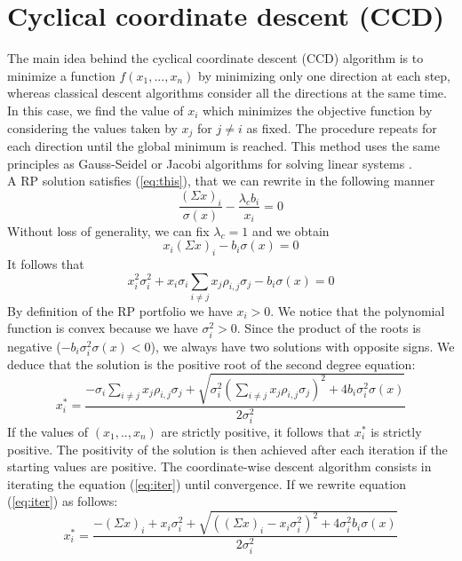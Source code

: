 \section{Cyclical coordinate descent (CCD)}The main idea behind the cyclical coordinate descent (CCD) algorithm is to minimize a function $f(x_1,...,x_n)$ by minimizing only one direction at each step, whereas classical descent algorithms consider all the directions at the same time. In this case, we find the value of $x_i$ which minimizes the objective function by considering the values taken by $x_j$ for $j \neq i$ as fixed. The procedure repeats for each direction until the global minimum is reached. This method uses the same principles as Gauss-Seidel or Jacobi algorithms for solving linear systems  \cite{ccd}.\\
A RP solution satisfies (\ref{eq:this}), that we can rewrite in the following manner
\begin{equation}
\frac{(\Sigma x)_i}{\sigma(x)} - \frac{\lambda_c b_i}{x_i} = 0
\end{equation}
Without loss of generality, we can fix $\lambda_c = 1$ and we obtain
\begin{equation}
x_i(\Sigma x)_i - b_i\sigma(x) = 0
\end{equation}
It follows that
\begin{equation}
x_i^2\sigma_i^2 + x_i\sigma_i\sum_{i \neq j} x_j \rho_{i,j} \sigma_j - b_i\sigma(x) = 0
\end{equation}
By definition of the RP portfolio we have $x_i > 0$. We notice that the polynomial function is convex because we have $\sigma_i^2 > 0$. Since the product of the roots is negative ($-b_i\sigma_i^2\sigma(x)<0$), we always have two solutions with opposite signs. We deduce that the solution is the positive root of the second degree equation:
\begin{equation}\label{eq:iter}
x_i^* = \frac{-\sigma_i\sum_{i \neq j} x_j \rho_{i,j} \sigma_j + \sqrt{\sigma_i^2(\sum_{i \neq j} x_j \rho_{i,j} \sigma_j)^2 + 4b_i\sigma_i^2\sigma(x)}}{2\sigma_i^2}
\end{equation}
If the values of $(x_1,.., x_n)$ are strictly positive, it follows that $x_i^*$ is strictly positive. The positivity of the solution is then achieved after each iteration if the starting values are positive. The coordinate-wise descent algorithm consists in iterating the equation (\ref{eq:iter}) until convergence. If we rewrite equation (\ref{eq:iter}) as follows:
\begin{equation}
x_i^* = \frac{-(\Sigma x)_i + x_i\sigma_i^2 + \sqrt{((\Sigma x)_i - x_i \sigma_i^2)^2 + 4\sigma_i^2b_i\sigma(x)}}{2\sigma_i^2}
\end{equation}
